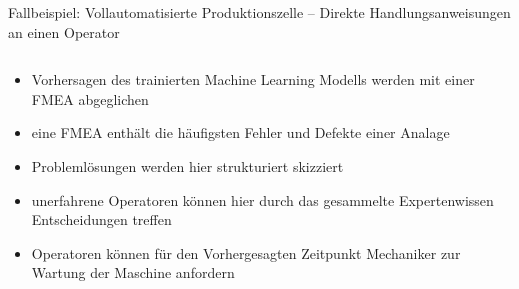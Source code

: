 \documentclass[aspectratio=1610, xcolor=dvipsnames, 9pt]{beamer}
\begin{document}
          \begin{frame}{Fallbeispiel: Vollautomatisierte Produktionszelle -- Direkte Handlungsanweisungen an einen Operator}
            \begin{columns}
              \begin{column}{0.6\textwidth}
                \begin{itemize}
                  \item Vorhersagen des trainierten Machine Learning Modells werden mit einer FMEA abgeglichen \newline
                  \item eine FMEA enthält die häufigsten Fehler und Defekte einer Analage \newline
                  \item Problemlösungen werden hier strukturiert skizziert \newline
                  \item unerfahrene Operatoren können hier durch das gesammelte Expertenwissen Entscheidungen treffen\newline
                  \item Operatoren können für den Vorhergesagten Zeitpunkt Mechaniker zur Wartung der Maschine anfordern
                \end{itemize}
              \end{column}
            \end{columns}
          \end{frame}
\end{document}
